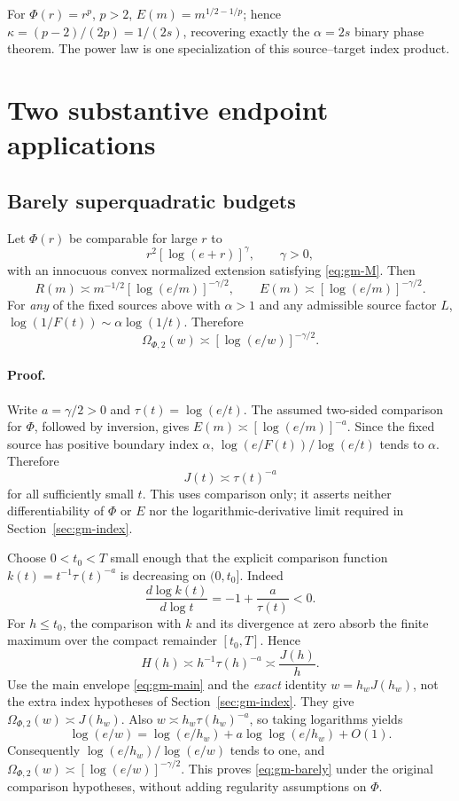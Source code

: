 For \(\Phi(r)=r^p\), \(p>2\), \(E(m)=m^{1/2-1/p}\); hence \(\kappa=(p-2)/(2p)=1/(2s)\), recovering exactly the \(\alpha=2s\) binary phase theorem. The power law is one specialization of this source--target index product.

\section{Two substantive endpoint applications}\label{sec:gm-endpoints}

\subsection{Barely superquadratic budgets}\label{sec:gm-barely}

Let \(\Phi(r)\) be comparable for large \(r\) to
\[
 r^2[\log(e+r)]^\gamma,\qquad \gamma>0,
\]
with an innocuous convex normalized extension satisfying \eqref{eq:gm-M}. Then
\[
 R(m)\asymp m^{-1/2}[\log(e/m)]^{-\gamma/2},\qquad
 E(m)\asymp[\log(e/m)]^{-\gamma/2}.
\]
For \emph{any} of the fixed sources above with \(\alpha>1\) and any admissible source factor \(L\), \(\log(1/F(t))\sim\alpha\log(1/t)\). Therefore
\begin{equation}
 \Omega_{\Phi,2}(w)\asymp[\log(e/w)]^{-\gamma/2}.
 \tag{7.1}\label{eq:gm-barely}
\end{equation}
\paragraph{Proof.}
Write \(a=\gamma/2>0\) and \(\tau(t)=\log(e/t)\). The assumed two-sided comparison for \(\Phi\), followed by inversion, gives \(E(m)\asymp[\log(e/m)]^{-a}\). Since the fixed source has positive boundary index \(\alpha\), \(\log(e/F(t))/\log(e/t)\) tends to \(\alpha\). Therefore
\[
 J(t)\asymp\tau(t)^{-a}
\]
for all sufficiently small \(t\). This uses comparison only; it asserts neither differentiability of \(\Phi\) or \(E\) nor the logarithmic-derivative limit required in Section~\ref{sec:gm-index}.

Choose \(0<t_0<T\) small enough that the explicit comparison function \(k(t)=t^{-1}\tau(t)^{-a}\) is decreasing on \((0,t_0]\). Indeed
\[
 \frac{d\log k(t)}{d\log t}=-1+\frac a{\tau(t)}<0.
\]
For \(h\le t_0\), the comparison with \(k\) and its divergence at zero absorb the finite maximum over the compact remainder \([t_0,T]\). Hence
\[
 H(h)\asymp h^{-1}\tau(h)^{-a}\asymp\frac{J(h)}h.
\]
Use the main envelope \eqref{eq:gm-main} and the \emph{exact} identity \(w=h_wJ(h_w)\), not the extra index hypotheses of Section~\ref{sec:gm-index}. They give \(\Omega_{\Phi,2}(w)\asymp J(h_w)\). Also \(w\asymp h_w\tau(h_w)^{-a}\), so taking logarithms yields
\[
 \log(e/w)=\log(e/h_w)+a\log\log(e/h_w)+O(1).
\]
Consequently \(\log(e/h_w)/\log(e/w)\) tends to one, and \(\Omega_{\Phi,2}(w)\asymp[\log(e/w)]^{-\gamma/2}\). This proves \eqref{eq:gm-barely} under the original comparison hypotheses, without adding regularity assumptions on \(\Phi\).

